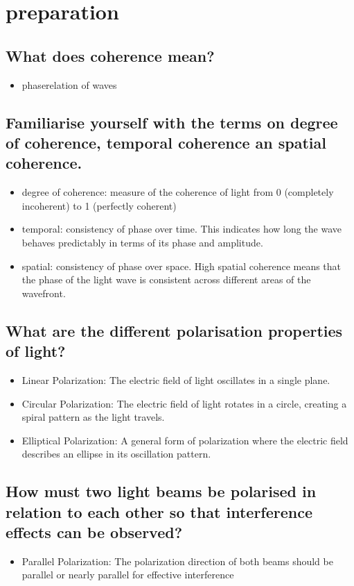 \section{preparation}

\subsection*{What does coherence mean?}
\begin{itemize}
    \item phaserelation of waves
\end{itemize}
\subsection*{Familiarise yourself with the terms on degree of coherence, temporal coherence an spatial coherence.}
\begin{itemize}
    \item degree of coherence: measure of the coherence of light from 0 (completely incoherent) to 1 (perfectly coherent)
    \item temporal: consistency of phase over time. This indicates how long the wave behaves predictably in terms of its phase and amplitude.
    \item spatial: consistency of phase over space. High spatial coherence means that the phase of the light wave is consistent across different areas of the wavefront.
\end{itemize}

\subsection*{What are the different polarisation properties of light?}
\begin{itemize}
    \item Linear Polarization: The electric field of light oscillates in a single plane.
    \item Circular Polarization: The electric field of light rotates in a circle, creating a spiral pattern as the light travels.
    \item Elliptical Polarization: A general form of polarization where the electric field describes an ellipse in its oscillation pattern.
\end{itemize}
\subsection*{How must two light beams be polarised in relation to each other so that interference effects can be observed?}
\begin{itemize}
    \item Parallel Polarization: The polarization direction of both beams should be parallel or nearly parallel for effective interference
\end{itemize}

